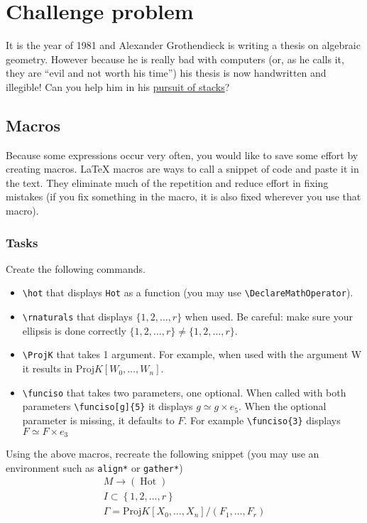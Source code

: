 \documentclass[a4paper,beeees]{hwhProblem}
\DeclareMathOperator{\hot}{Hot}
\newcommand{\rnaturals}{\left\{1,2,\dotsc,r\right\}}
\newcommand{\ProjK}[1]{\text{Proj}K[{#1}_0,\dotsc,{#1}_n]}
\newcommand{\funciso}[2][F]{#1 \simeq{} #1 \times{} e_{#2}}
\begin{document}
\section*{Challenge problem}
It is the year of 1981 and Alexander Grothendieck is writing a thesis on algebraic geometry. However because he is really bad with computers (or, as he calls it, they are ``evil and not worth his time'') his thesis is now handwritten and illegible! Can you help him in his \href{https://en.wikipedia.org/wiki/Pursuing_Stacks}{pursuit of stacks}?

\subsection*{Macros}
Because some expressions occur very often, you would like to save some effort by creating macros. \LaTeX{} macros are ways to call a snippet of code and paste it in the text. They eliminate much of the repetition and reduce effort in fixing mistakes (if you fix something in the macro, it is also fixed wherever you use that macro).
\subsubsection*{Tasks}
Create the following commands.
\begin{itemize}
\item \verb|\hot| that displays \texttt{Hot} as a function (you may use \verb|\DeclareMathOperator|).
\item \verb|\rnaturals| that displays \(\{1,2,\dotsc,r\}\) when used. Be careful: make sure your ellipsis is done correctly \(\{1,2,\dotsc,r\}\neq\{1,2,...,r\}\).
\item \verb|\ProjK| that takes 1 argument. For example, when used with the argument W it results in \(\ProjK{W}\).
\item \verb|\funciso| that takes two parameters, one optional. When called with both parameters \verb|\funciso[g]{5}| it displays \(\funciso[g]{5}\). When the optional parameter is missing, it defaults to \(F\). For example \verb|\funciso{3}| displays \(\funciso{3}\)
\end{itemize}
Using the above macros, recreate the following snippet (you may use an environment such as \texttt{align*} or \texttt{gather*})
\begin{gather*}
  M\to(\hot)\\
  I \subset \rnaturals\\
  \Gamma = \ProjK{X}/(F_1,\dotsc,F_r)
\end{gather*}
\end{document}
